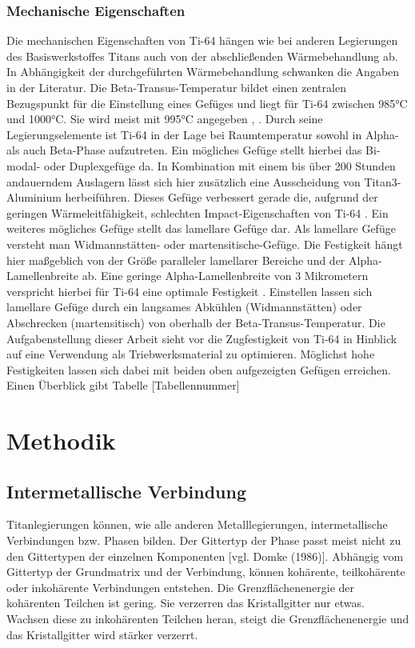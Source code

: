 \documentclass[a4paper, 11pt]{tubsreprt}
\begin{document}
\subsection{Mechanische Eigenschaften}
Die mechanischen Eigenschaften von Ti-64 hängen wie bei anderen Legierungen des Basiswerkstoffes Titans auch von der abschließenden Wärmebehandlung ab. In Abhängigkeit der durchgeführten Wärmebehandlung schwanken die Angaben in der Literatur. Die Beta-Transus-Temperatur bildet einen zentralen Bezugspunkt für die Einstellung eines Gefüges und liegt für Ti-64 zwischen 985°C und 1000°C. Sie wird meist mit 995°C angegeben \cite{Semiatin2003}, \cite{Chen2008}. Durch seine Legierungselemente ist Ti-64 in der Lage bei Raumtemperatur sowohl in Alpha- als auch Beta-Phase aufzutreten.
Ein mögliches Gefüge stellt hierbei das Bi-modal- oder Duplexgefüge da. In Kombination mit einem bis über 200 Stunden andauerndem Auslagern lässt sich hier zusätzlich eine Ausscheidung von Titan3-Aluminium herbeiführen. Dieses Gefüge verbessert gerade die, aufgrund der geringen Wärmeleitfähigkeit, schlechten Impact-Eigenschaften von Ti-64 \cite{Semiatin2003}.
Ein weiteres mögliches Gefüge stellt das lamellare Gefüge dar. Als lamellare Gefüge versteht man Widmannstätten- oder martensitische-Gefüge. Die Festigkeit hängt hier maßgeblich von der Größe paralleler lamellarer Bereiche und der Alpha-Lamellenbreite ab. Eine geringe Alpha-Lamellenbreite von 3 Mikrometern verspricht hierbei für Ti-64 eine optimale Festigkeit \cite{Sieniawski2013}. Einstellen lassen sich lamellare Gefüge durch ein langsames Abkühlen (Widmannstätten) oder Abschrecken (martensitisch) von oberhalb der Beta-Transus-Temperatur. 
Die Aufgabenstellung dieser Arbeit sieht vor die Zugfestigkeit von Ti-64 in Hinblick auf eine Verwendung als Triebwerksmaterial zu optimieren. Möglichst hohe Festigkeiten lassen sich dabei mit beiden oben aufgezeigten Gefügen erreichen. Einen Überblick gibt Tabelle [Tabellennummer]


\chapter{Methodik}
\section{Intermetallische Verbindung}
Titanlegierungen können, wie alle anderen Metalllegierungen, intermetallische Verbindungen bzw. Phasen bilden. Der Gittertyp der Phase passt meist nicht zu den Gittertypen der einzelnen Komponenten [vgl. Domke (1986)]. Abhängig vom Gittertyp der Grundmatrix und der Verbindung,  können kohärente, teilkohärente oder inkohärente Verbindungen entstehen. Die Grenzflächenenergie der kohärenten Teilchen ist gering. Sie verzerren das Kristallgitter nur etwas. Wachsen diese zu inkohärenten Teilchen heran, steigt die Grenzflächenenergie und das Kristallgitter wird stärker verzerrt.
\end{document}
